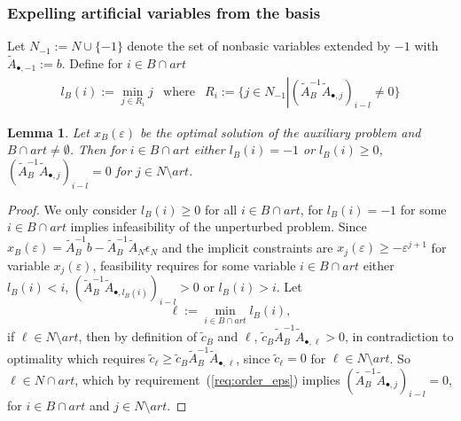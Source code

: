 \documentclass[a4paper]{article}
\newtheorem{lemma}{Lemma}
\begin{document}
\subsubsection{Expelling artificial variables from the basis}
Let $N_{-1}:=N \cup \{-1\}$ denote the set of nonbasic variables extended
by $-1$ with $\tilde{A}_{\bullet, -1}:=b$. Define for $i \in B \cap art$
\begin{eqnarray*}
  l_{B}\left(i\right):=\min_{j \in R_{i}} j & \text{where}&
  R_{i}:=\{ j \in N_{-1} \left| \right.
  \left(\tilde{A}_{B}^{-1}\tilde{A}_{\bullet, j}\right)_{i-l} \neq 0 \}
\end{eqnarray*}
\begin{lemma}
\label{lem:art_BxN_zero}
Let $x_{B}(\varepsilon)$ be the optimal solution of the auxiliary problem and
$B \cap art \neq \emptyset$. Then for $i \in B \cap art$ either
$l_{B}\left(i\right) = -1$ or $l_{B}\left(i\right) \geq 0$,
$(\tilde{A}_{B}^{-1}\tilde{A}_{\bullet,j})_{i-l} = 0$
for $j \in N \setminus art$.
\end{lemma}
\begin{proof}
We only consider $l_{B}\left(i\right) \geq 0$ for all $i \in B \cap art$, for
$l_{B}\left(i\right) = -1$ for some $i \in B \cap art$ implies infeasibility of
the unperturbed problem. 
Since $x_{B}(\varepsilon) = \tilde{A}_{B}^{-1}b - \tilde{A}_{B}^{-1}
\tilde{A}_{N}\epsilon_{N}$
and the implicit constraints are $x_{j}(\varepsilon) \geq -\varepsilon^{j+1}$
for variable $x_{j}(\varepsilon)$, feasibility requires
for some variable $i \in B \cap art$ either $l_{B}\left(i\right) < i$,
$(\tilde{A}_{B}^{-1}\tilde{A}_{\bullet, l_{B}\left(i\right)})_{i-l} > 0$ or
$l_{B}\left(i\right) > i$. Let
\begin{equation*}
  \ell:= \min_{i \in B \cap art} l_{B}\left(i\right),
\end{equation*}
if $\ell \in N \setminus art$,
then by definition of $\tilde{c}_{B}$ and $\ell$,
$\tilde{c}_{B}\tilde{A}_{B}^{-1}\tilde{A}_{\bullet, \ell} > 0$,
in contradiction to optimality which requires
$\tilde{c}_{\ell} \geq
\tilde{c}_{B}\tilde{A}_{B}^{-1}\tilde{A}_{\bullet, \ell}$,
since $\tilde{c}_{\ell}=0$ for 
$\ell \in N \setminus art$.
So $\ell \in N \cap art$, which by requirement~(\ref{req:order_eps}) implies
$(\tilde{A}_{B}^{-1}\tilde{A}_{\bullet, j})_{i-l}=0$, for
$i \in B \cap art$ and $j \in N \setminus art$. 
\end{proof}
\end{document}
